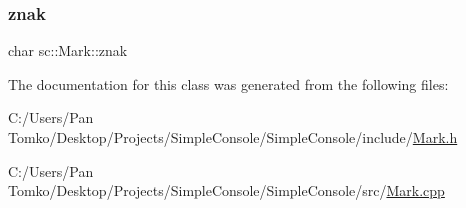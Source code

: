 \mbox{\label{classsc_1_1_mark_a0b63d459e3ba442f7a22ce5b8e4d4e21}} 
\subsubsection{\texorpdfstring{znak}{znak}}
{\footnotesize\ttfamily char sc\+::\+Mark\+::znak}



The documentation for this class was generated from the following files\+:\begin{DoxyCompactItemize}
\item 
C\+:/\+Users/\+Pan Tomko/\+Desktop/\+Projects/\+Simple\+Console/\+Simple\+Console/include/\mbox{\hyperlink{_mark_8h}{Mark.\+h}}\item 
C\+:/\+Users/\+Pan Tomko/\+Desktop/\+Projects/\+Simple\+Console/\+Simple\+Console/src/\mbox{\hyperlink{_mark_8cpp}{Mark.\+cpp}}\end{DoxyCompactItemize}
